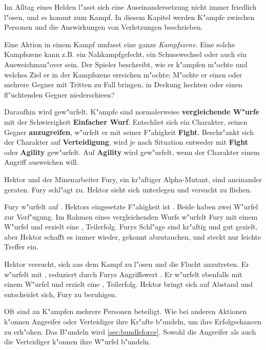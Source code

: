
Im Alltag eines Helden l"asst sich eine Auseinandersetzung nicht immer friedlich l"osen, und es kommt zum Kampf. In diesem Kapitel werden K"ampfe zwischen Personen und die Auswirkungen von Verletzungen beschrieben.

Eine Aktion in einem Kampf umfasst eine ganze \emph{Kampfszene}. Eine solche Kampfszene kann z.B. ein Nahkampfgefecht, ein Schusswechsel oder auch ein Ausweichman"over sein. Der Spieler beschreibt, wie er k"ampfen m"ochte und welches Ziel er in der Kampfszene erreichen m"ochte: M"ochte er einen oder mehrere Gegner mit Tritten zu Fall bringen, in Deckung hechten oder einen fl"uchtenden Gegner niederschie\3en?

Daraufhin wird gew"urfelt. K"ampfe sind normalerweise \textbf{vergleichende W"urfe} mit der Schwierigkeit \textbf{Einfacher Wurf}. Entschlie\3t sich ein Charakter, seinen Gegner \textbf{anzugreifen}, w"urfelt er mit seiner F"ahigkeit \textbf{Fight}. Beschr"ankt sich der Charakter auf \textbf{Verteidigung}, wird je nach Situation entweder mit \textbf{Fight} oder \textbf{Agility} gew"urfelt. Auf \textbf{Agility} wird gew"urfelt, wenn der Charakter einem Angriff ausweichen will.

\begin{ruleexample}
    Hektor und der Minenarbeiter Fury, ein kr"aftiger Alpha-Mutant, sind aneinander geraten. Fury schl"agt zu. Hektor sieht sich unterlegen und versucht zu fliehen.

    Fury w"urfelt auf . Hektors eingesetzte F"ahigkeit ist . Beide haben zwei W"urfel zur Verf"ugung. Im Rahmen eines vergleichenden Wurfs w"urfelt Fury mit einem W"urfel und erzielt eine , Teilerfolg. Furys Schl"age sind kr"aftig und gut gezielt, aber Hektor schafft es immer wieder, gekonnt abzutauchen, und steckt nur leichte Treffer ein.

    Hektor versucht, sich aus dem Kampf zu l"osen und die Flucht anzutreten. Er w"urfelt mit , reduziert durch Furys Angriffswert . Er w"urfelt ebenfalls mit einem W"urfel und erzielt eine , Teilerfolg. Hektor bringt sich auf Abstand und entscheidet sich, Fury zu beruhigen.
\end{ruleexample}

Oft sind an K"ampfen mehrere Personen beteiligt. Wie bei anderen Aktionen k"onnen Angreifer oder Verteidiger ihre Kr"afte b"undeln, um ihre Erfolgschancen zu erh"ohen. Das B"undeln wird \cref{sec:bundleforce}. Sowohl die Angreifer als auch die Verteidiger k"onnen ihre W"urfel b"undeln.

